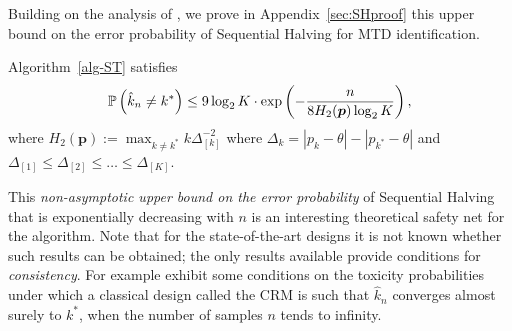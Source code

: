 Building on the analysis of \cite{Karnin13}, we prove in Appendix~\ref{sec:SHproof} this upper bound on the error probability of Sequential Halving for MTD identification.  

\begin{theorem}\label{thm:SH}
Algorithm~\ref{alg-ST} satisfies 
\begin{align*}
  \mathbb{P}\left(\hat{k}_n \neq k^*\right) \leq 9 \log_2 K \cdot \exp \left(
  - \frac{n}{8 H_2 (\bm p)\log_2 K}
  \right),
\end{align*}
where $H_2(\bm p):= \max_{k \ne k^*} {k}{\Delta_{[k]}^{-2}}$ where $\Delta_k = |p_k - \theta| - |p_{k^*} - \theta|$ and $\Delta_{[1]} \leq \Delta_{[2]} \leq \dots \leq \Delta_{[K]}$.
\end{theorem}

This \emph{non-asymptotic upper bound on the error probability} of Sequential Halving that is exponentially decreasing with $n$ is an interesting theoretical safety net for the algorithm. Note that for the state-of-the-art designs it is not known whether such results can be obtained; the only results available provide conditions for \emph{consistency}. For example \cite{ShenOQuigley96,CheungChappell02} exhibit some conditions on the toxicity probabilities under which a classical design called the CRM is such that $\hat{k}_n$ converges almost surely to $k^*$, when the number of samples $n$ tends to infinity. 



